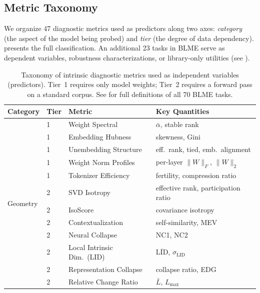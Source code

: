 \documentclass{article}
\begin{document}
\subsection{Metric Taxonomy}
\label{sec:taxonomy}

We organize 47 diagnostic metrics used as predictors along two axes: \emph{category} (the aspect of the model being probed) and \emph{tier} (the degree of data dependency).  presents the full classification. An additional 23 tasks in BLME serve as dependent variables, robustness characterizations, or library-only utilities (see ).

\begin{table}[t]
\centering
\caption{Taxonomy of intrinsic diagnostic metrics used as independent variables (predictors). Tier~1 requires only model weights; Tier~2 requires a forward pass on a standard corpus. See  for full definitions of all 70 BLME tasks.}
\label{tab:taxonomy}
\small
\begin{tabular}{@{}llll@{}}
\toprule
\textbf{Category} & \textbf{Tier} & \textbf{Metric} & \textbf{Key Quantities} \\
\midrule
\multirow{19}{*}{Geometry}
  & 1 & Weight Spectral & $\bar\alpha$, stable rank \\
  & 1 & Embedding Hubness & skewness, Gini \\
  & 1 & Unembedding Structure & eff.\ rank, tied, emb.\ alignment \\
  & 1 & Weight Norm Profiles & per-layer $\|W\|_F$, $\|W\|_2$ \\
  & 1 & Tokenizer Efficiency & fertility, compression ratio \\
  \cmidrule(l){2-4}
  & 2 & SVD Isotropy & effective rank, participation ratio \\
  & 2 & IsoScore & covariance isotropy \citep{rudman2022isoscore} \\
  & 2 & Contextualization & self-similarity, MEV \citep{ethayarajh2019contextual} \\
  & 2 & Neural Collapse & NC1, NC2 \citep{papyan2020prevalence} \\
  & 2 & Local Intrinsic Dim.\ (LID) & $\overline{\text{LID}}$, $\sigma_{\text{LID}}$ \\
  & 2 & Representation Collapse & collapse ratio, EDG \\
  & 2 & Relative Change Ratio & $\bar{L}$, $L_{\max}$ \\

\end{tabular}
\end{table}
\end{document}
